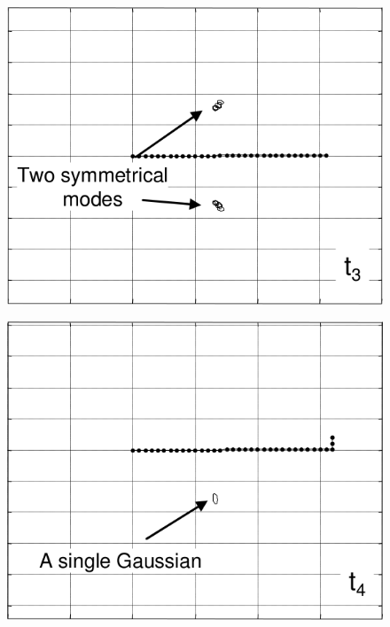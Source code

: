 \documentclass{beamer}
\begin{document}
\begin{frame}
\begin{columns}
\begin{overlayarea}{\textwidth}{.9\textheight}
{\begin{figure}
						\caption{\cite{blanco2008efficient}}
					\end{figure}
				}
				{
					\begin{figure}
						\centering
						\includegraphics[width=\linewidth]{blanco2008efficient_fig3_3}
						\caption{\cite{blanco2008efficient}}
					\end{figure}
				}
				{
					\begin{figure}
						\centering
						\includegraphics[width=\linewidth]{blanco2008efficient_fig3_4}
						\caption{\cite{blanco2008efficient}}
					\end{figure}
}
\end{overlayarea}
\end{columns}
\end{frame}
\end{document}
